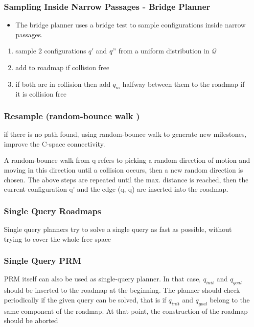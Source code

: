 \documentclass{beamer}
\begin{document}
  \begin{frame}
    \frametitle{Sampling Inside Narrow Passages - Bridge Planner}
  
    \begin{itemize}
      \item The bridge planner uses a bridge test to sample configurations inside narrow passages.
    \end{itemize}

    \begin{enumerate}
      \item sample 2 configurations $q'$ and $q"$ from a uniform distribution in $\mathcal{Q}$
      \item add to roadmap if collision free
      \item if both are in collision then add $q_{m}$ halfway between them to the roadmap if it is collision free
    \end{enumerate}
  
  \end{frame}

  \begin{frame}
    \frametitle{Resample (random-bounce walk )}
    if there is no path found, using random-bounce walk to generate new milestones, improve the C-space connectivity.
    
    A random-bounce walk from q refers to picking a random direction of motion and moving in this direction until a collision occurs, then a new random direction is chosen. The above steps are repeated until the max. distance is reached, then the current configuration q' and the edge (q, q) are inserted into the roadmap.
  
  \end{frame}

  \begin{frame}
    \frametitle{Single Query Roadmaps}
    Single query planners try to solve a single query as fast as possible, without trying to cover the whole free space
    
  \end{frame}

  \begin{frame}
    \frametitle{Single Query PRM}
  
    PRM itself can also be used as single-query planner. In that case, $q_{init}$ and $q_{goal}$ should be inserted to the roadmap at the beginning. The planner should check periodically if the given query can be solved, that is if $q_{init}$ and $q_{goal}$ belong to the same component of the roadmap. At that point, the construction of the roadmap should be aborted
  
  \end{frame}
\end{document}
